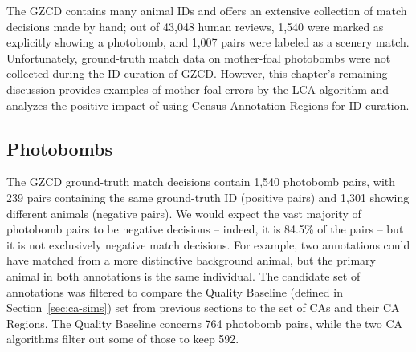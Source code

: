 The GZCD contains many animal IDs and offers an extensive collection of match decisions made by hand; out of 43,048 human reviews, 1,540 were marked as explicitly showing a photobomb, and 1,007 pairs were labeled as a scenery match.  Unfortunately, ground-truth match data on mother-foal photobombs were not collected during the ID curation of GZCD.  However, this chapter's remaining discussion provides examples of mother-foal errors by the LCA algorithm and analyzes the positive impact of using Census Annotation Regions for ID curation.

\subsection{Photobombs}

The GZCD ground-truth match decisions contain 1,540 photobomb pairs, with 239 pairs containing the same ground-truth ID (positive pairs) and 1,301 showing different animals (negative pairs).  We would expect the vast majority of photobomb pairs to be negative decisions -- indeed, it is 84.5\% of the pairs -- but it is not exclusively negative match decisions.  For example, two annotations could have matched from a more distinctive background animal, but the primary animal in both annotations is the same individual.  The candidate set of annotations was filtered to compare the Quality Baseline (defined in Section~\ref{sec:ca-sims}) set from previous sections to the set of CAs and their CA Regions.  The Quality Baseline concerns 764 photobomb pairs, while the two CA algorithms filter out some of those to keep 592.

